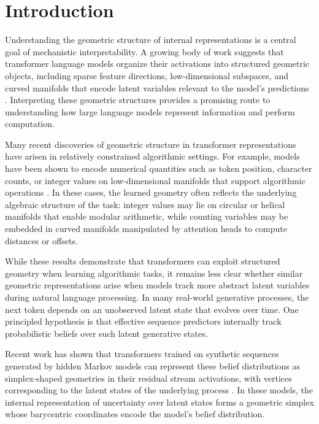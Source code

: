 \documentclass{article}
\begin{document}
\section{Introduction}
\label{sec:intro}

Understanding the geometric structure of internal representations is a central goal of mechanistic interpretability.  A growing body of work
suggests that transformer language models organize their activations into structured geometric objects, including sparse feature
directions, low-dimensional subspaces, and curved manifolds that encode latent variables relevant to the model's predictions
\citep{elhage2022toy, cunningham2023sparse, bricken2023monosemanticity, gurnee2023language}.  Interpreting these geometric structures provides
a promising route to understanding how large language models represent information and perform computation.

Many recent discoveries of geometric structure in transformer representations have arisen in relatively constrained algorithmic
settings.  For example, models have been shown to encode numerical quantities such as token position, character counts, or integer values
on low-dimensional manifolds that support algorithmic operations \citep{gurnee2025manifolds, kantamneni2025trigonometry}.  In these
cases, the learned geometry often reflects the underlying algebraic structure of the task: integer values may lie on circular or helical
manifolds that enable modular arithmetic, while counting variables may be embedded in curved manifolds manipulated by attention heads to
compute distances or offsets.

While these results demonstrate that transformers can exploit structured geometry when learning algorithmic tasks, it remains less
clear whether similar geometric representations arise when models track more abstract latent variables during natural language
processing.  In many real-world generative processes, the next token depends on an unobserved latent state that evolves over time.  One
principled hypothesis is that effective sequence predictors internally track probabilistic beliefs over such latent generative states.

Recent work has shown that transformers trained on synthetic sequences generated by hidden Markov models can represent these belief
distributions as simplex-shaped geometries in their residual stream activations, with vertices corresponding to the latent states of the
underlying process \citep{shai2024transformers, piotrowski2025constrained}. In these models, the internal representation of uncertainty over latent
states forms a geometric simplex whose barycentric coordinates encode the model's belief distribution.
\end{document}

